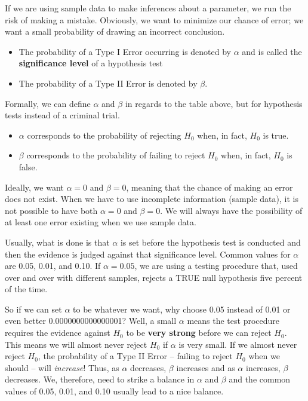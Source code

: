 \documentclass[]{tufte-book}
\providecommand{\tightlist}{%
  \setlength{\itemsep}{0pt}\setlength{\parskip}{0pt}}
\begin{document}
If we are using sample data to make inferences about a parameter, we run
the risk of making a mistake. Obviously, we want to minimize our chance
of error; we want a small probability of drawing an incorrect
conclusion.

\begin{itemize}
\tightlist
\item
  The probability of a Type I Error occurring is denoted by \(\alpha\)
  and is called the \textbf{significance level} of a hypothesis test
\item
  The probability of a Type II Error is denoted by \(\beta\).
\end{itemize}

Formally, we can define \(\alpha\) and \(\beta\) in regards to the table
above, but for hypothesis tests instead of a criminal trial.

\begin{itemize}
\tightlist
\item
  \(\alpha\) corresponds to the probability of rejecting \(H_0\) when,
  in fact, \(H_0\) is true.
\item
  \(\beta\) corresponds to the probability of failing to reject \(H_0\)
  when, in fact, \(H_0\) is false.
\end{itemize}

Ideally, we want \(\alpha = 0\) and \(\beta = 0\), meaning that the
chance of making an error does not exist. When we have to use incomplete
information (sample data), it is not possible to have both
\(\alpha = 0\) and \(\beta = 0\). We will always have the possibility of
at least one error existing when we use sample data.

Usually, what is done is that \(\alpha\) is set before the hypothesis
test is conducted and then the evidence is judged against that
significance level. Common values for \(\alpha\) are 0.05, 0.01, and
0.10. If \(\alpha = 0.05\), we are using a testing procedure that, used
over and over with different samples, rejects a TRUE null hypothesis
five percent of the time.

So if we can set \(\alpha\) to be whatever we want, why choose 0.05
instead of 0.01 or even better 0.0000000000000001? Well, a small
\(\alpha\) means the test procedure requires the evidence against
\(H_0\) to be \textbf{very strong} before we can reject \(H_0\). This
means we will almost never reject \(H_0\) if \(\alpha\) is very small.
If we almost never reject \(H_0\), the probability of a Type II Error --
failing to reject \(H_0\) when we should -- will \emph{increase}! Thus,
as \(\alpha\) decreases, \(\beta\) increases and as \(\alpha\)
increases, \(\beta\) decreases. We, therefore, need to strike a balance
in \(\alpha\) and \(\beta\) and the common values of 0.05, 0.01, and
0.10 usually lead to a nice balance.
\end{document}

